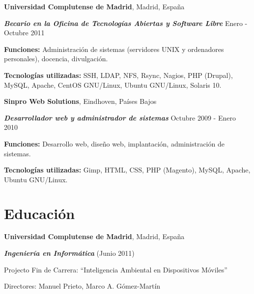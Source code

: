 \documentclass[margin,line]{resume}
\begin{document}
\begin{resume}
{\bf Universidad Complutense de Madrid}, Madrid, España

\vspace{-.3cm}
{\bf \em Becario en la Oficina de Tecnologías Abiertas y Software Libre} \hfill
{ Enero - Octubre 2011
}
\begin{list2}
\vspace*{.05in}
\item {\bf Funciones: }{Administración de sistemas (servidores UNIX y ordenadores
personales), docencia, divulgación.}
\item {\bf Tecnologías utilizadas: }{SSH, LDAP, NFS, Rsync, Nagios, PHP
(Drupal), MySQL, Apache, CentOS GNU/Linux, Ubuntu GNU/Linux, Solaris 10.}
\end{list2}



{\bf Sinpro Web Solutions}, Eindhoven, Países Bajos

\vspace{-.3cm}
{\bf \em Desarrollador web y administrador de sistemas} \hfill { Octubre 2009 -
Enero 2010}
\begin{list2}
\vspace*{.05in}
\item {\bf Funciones: }{Desarrollo web, diseño web, implantación, administración de
sistemas.}
\item {\bf Tecnologías utilizadas: }{Gimp, HTML, CSS, PHP (Magento), MySQL,
Apache, Ubuntu GNU/Linux.}
\end{list2}

\section{\sc Educación}
{\bf Universidad Complutense de Madrid}, Madrid, España\\
\vspace*{-.1in}
\begin{list1}
\item[] {\bf \em Ingeniería en Informática }(Junio 2011) 
\begin{list2}
\vspace*{.05in}
\item Projecto Fin de Carrera:  ``Inteligencia Ambiental en Dispositivos Móviles'' 
\item Directores:  Manuel Prieto, Marco A. Gómez-Martín
\end{list2}
\end{list1}



\end{resume}
\end{document}
